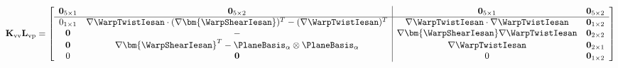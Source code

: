 \[
\mathbf{K}_{\rm vv}\mathbf{L}_{\rm vp} = \left[\begin{array}{cc|cc}
\mathbf{0}_{5\times 1} & \mathbf{0}_{5\times 2} &
\mathbf{0}_{5\times 1} & \mathbf{0}_{5\times 2} \\ \hline
0_{1\times1} & \nabla\WarpTwistIesan \cdot(\nabla\bm{\WarpShearIesan})^T - (\nabla \WarpTwistIesan)^T 
& \nabla\WarpTwistIesan\cdot\nabla\WarpTwistIesan & \mathbf{0}_{1\times2} \\
\mathbf{0} & -
& \nabla\bm{\WarpShearIesan}\nabla\WarpTwistIesan & \mathbf{0}_{2\times2}\\
\mathbf{0} & \nabla\bm{\WarpShearIesan}^T - \PlaneBasis_{\alpha}\otimes\PlaneBasis_{\alpha} 
& \nabla\WarpTwistIesan & \mathbf{0}_{2\times1} \\
  0 & \mathbf{0} 
& 0 & \mathbf{0}_{1\times 2}
\end{array}\right]
\]



